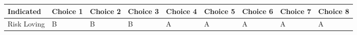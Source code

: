 \begin{tabular}{lllllllll}
\toprule
   Indicated & Choice 1 & Choice 2 & Choice 3 & Choice 4 & Choice 5 & Choice 6 & Choice 7 & Choice 8 \\
\midrule
 Risk Loving &        B &        B &        B &        A &        A &        A &        A &        A \\
\bottomrule
\end{tabular}
